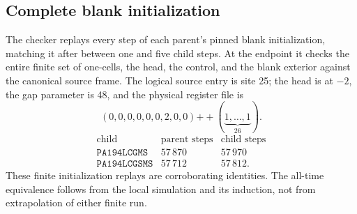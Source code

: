 \subsection{Complete blank initialization}
The checker replays every step of each parent's pinned blank initialization,
matching it after between one and five child steps.  At the endpoint it
checks the entire finite set of one-cells, the head, the control, and the
blank exterior against the canonical source frame.  The logical source
entry is site 25; the head is at $-2$, the gap parameter is 48, and the
physical register file is
\[
 (0,0,0,0,0,0,2,0,0)\mathbin{+\!+}(\underbrace{1,\ldots,1}_{26}).
\]
\[
\begin{array}{lrr}
\text{child}&\text{parent steps}&\text{child steps}\\\hline
\texttt{PA194LCGMS}&57\,870&57\,970\\
\texttt{PA194LCGSMS}&57\,712&57\,812.
\end{array}
\]
These finite initialization replays are corroborating identities.  The
all-time equivalence follows from the local simulation and its induction,
not from extrapolation of either finite run.
